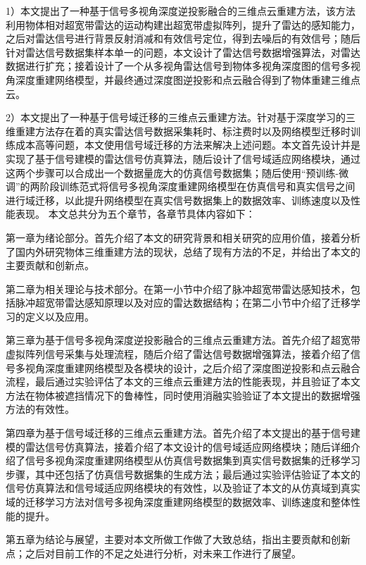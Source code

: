 1）本文提出了一种基于信号多视角深度逆投影融合的三维点云重建方法，该方法利用物体相对超宽带雷达的运动构建出超宽带虚拟阵列，提升了雷达的感知能力，之后对雷达信号进行背景反射消减和有效信号定位，得到去噪后的有效信号；随后针对雷达信号数据集样本单一的问题，本文设计了雷达信号数据增强算法，对雷达数据进行扩充；接着设计了一个从多视角雷达信号到物体多视角深度图的信号多视角深度重建网络模型，并最终通过深度图逆投影和点云融合得到了物体重建三维点云。

2）本文提出了一种基于信号域迁移的三维点云重建方法。针对基于深度学习的三维重建方法存在着的真实雷达信号数据采集耗时、标注费时以及网络模型迁移时训练成本高等问题，本文使用信号域迁移的方法来解决上述问题。本文首先设计并是实现了基于信号建模的雷达信号仿真算法，随后设计了信号域适应网络模块，通过这两个步骤可以合成出一个数据量庞大的仿真信号数据集；随后使用“预训练-微调”的两阶段训练范式将信号多视角深度重建网络模型在仿真信号和真实信号之间进行域迁移，以此提升网络模型在真实信号数据集上的数据效率、训练速度以及性能表现。
本文总共分为五个章节，各章节具体内容如下：

第一章为绪论部分。首先介绍了本文的研究背景和相关研究的应用价值，接着分析了国内外研究物体三维重建方法的现状，总结了现有方法的不足，并给出了本文的主要贡献和创新点。

第二章为相关理论与技术部分。在第一小节中介绍了脉冲超宽带雷达感知技术，包括脉冲超宽带雷达感知原理以及对应的雷达数据结构；在第二小节中介绍了迁移学习的定义以及应用。

第三章为基于信号多视角深度逆投影融合的三维点云重建方法。首先介绍了超宽带虚拟阵列信号采集与处理流程，随后介绍了雷达信号数据增强算法，接着介绍了信号多视角深度重建网络模型及各模块的设计，之后介绍了深度图逆投影和点云融合流程，最后通过实验评估了本文的三维点云重建方法的性能表现，并且验证了本文方法在物体被遮挡情况下的鲁棒性，同时使用消融实验验证了本文提出的数据增强方法的有效性。

第四章为基于信号域迁移的三维点云重建方法。首先介绍了本文提出的基于信号建模的雷达信号仿真算法，接着介绍了本文设计的信号域适应网络模块；随后详细介绍了信号多视角深度重建网络模型从仿真信号数据集到真实信号数据集的迁移学习步骤，其中还包括了仿真信号数据集的生成方法；最后通过实验评估验证了本文的信号仿真算法和信号域适应网络模块的有效性，以及验证了本文的从仿真域到真实域的迁移学习方法对信号多视角深度重建网络模型的数据效率、训练速度和整体性能的提升。

第五章为结论与展望，主要对本文所做工作做了大致总结，指出主要贡献和创新点；之后对目前工作的不足之处进行分析，对未来工作进行了展望。